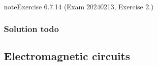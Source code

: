 \documentclass[letterpaper,10pt,english]{jupyterBook}
\begin{document}
\begin{sphinxadmonition}{note}{Exercise 6.7.14 (Exam 2024\sphinxhyphen{}02\sphinxhyphen{}13, Exercise 2.)}



\begin{figure}[htbp]
\centering

\noindent{}
\end{figure}
\subsubsection*{Solution \sphinxhyphen{} todo}
\end{sphinxadmonition}

\sphinxstepscope


\subsection{Electromagnetic circuits}
\label{\detokenize{ch/electrical-engineering-exercises-electromagnetic:electromagnetic-circuits}}\label{\detokenize{ch/electrical-engineering-exercises-electromagnetic:classical-electromagnetism-electrical-engineering-exercises-electromagnetic}}\label{\detokenize{ch/electrical-engineering-exercises-electromagnetic::doc}}
\end{document}
